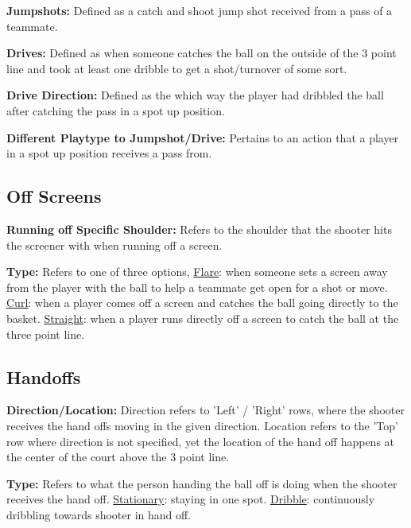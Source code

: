 \documentclass[a4paper,12pt]{article}
\begin{document}
    \noindent \textbf{Jumpshots:} Defined as a catch and shoot jump shot received from a pass of a teammate. 
    
    \noindent \textbf{Drives:} Defined as when someone catches the ball on the outside of the 3 point line and took at least one dribble to get a shot/turnover of some sort.
    
    \noindent \textbf{Drive Direction:} Defined as the which way the player had dribbled the ball after catching the pass in a spot up position.
    
    \noindent \textbf{Different Playtype to Jumpshot/Drive:} Pertains to an action that a player in a spot up position receives a pass from. 

\vspace{.5em}

\subsection*{Off Screens}

    \noindent \textbf{Running off Specific Shoulder:} Refers to the shoulder that the shooter hits the screener with when running off a screen. 
    
    \noindent \textbf{Type:} Refers to one of three options, \underline{Flare}: when someone sets a screen away from the player with the ball to help a teammate get open for a shot or move. \underline{Curl}: when a player comes off a screen and catches the ball going directly to the basket. \underline{Straight}: when a player runs directly off a screen to catch the ball at the three point line. 

\vspace{.5em}


\subsection*{Handoffs}

    \noindent \textbf{Direction/Location:} Direction refers to 'Left' / 'Right' rows, where the shooter receives the hand offs moving in the given direction. Location refers to the 'Top' row where direction is not specified, yet the location of the hand off happens at the center of the court above the 3 point line. 
    
    \noindent \textbf{Type:} Refers to what the person handing the ball off is doing when the shooter receives the hand off. \underline{Stationary}: staying in one spot. \underline{Dribble}: continuously dribbling towards shooter in hand off.
\end{document}
